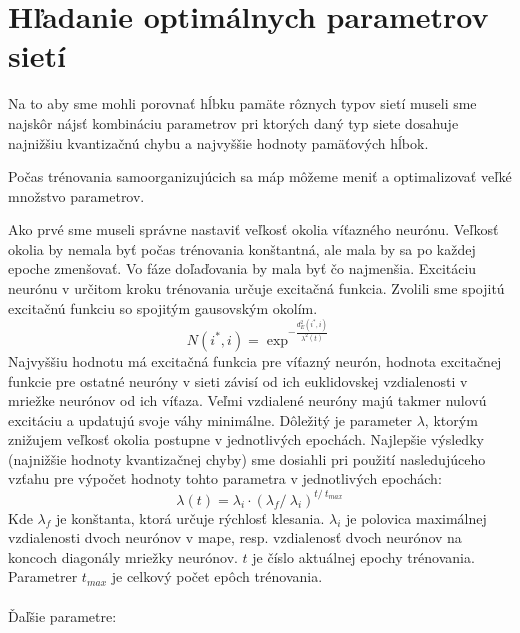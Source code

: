 \section{Hľadanie optimálnych parametrov sietí}
Na to aby sme mohli porovnať hĺbku pamäte rôznych typov sietí museli sme najskôr
nájsť kombináciu parametrov pri ktorých daný typ siete dosahuje najnižšiu kvantizačnú chybu a 
najvyššie hodnoty pamäťových hĺbok. 

Počas trénovania samoorganizujúcich sa máp môžeme meniť a optimalizovať veľké množstvo parametrov. 

Ako prvé sme museli správne nastaviť veľkosť okolia víťazného neurónu.
Veľkosť okolia by nemala byť počas trénovania konštantná, ale mala by sa po každej epoche zmenšovať.
Vo fáze doľaďovania by mala byť čo najmenšia.
Excitáciu neurónu v určitom kroku trénovania určuje excitačná funkcia. Zvolili sme spojitú
excitačnú funkciu so spojitým gausovským okolím. 
\begin{equation}
    N(i^{*}, i) = \exp^{- \frac{d^{2}_{E}(i^{*}, i)}{\lambda^{2}(t)}}
\end{equation}
Najvyššiu hodnotu má excitačná funkcia pre víťazný neurón, hodnota excitačnej funkcie pre ostatné 
neuróny v sieti závisí od ich euklidovskej vzdialenosti v mriežke neurónov od ich víťaza. Veľmi vzdialené neuróny 
majú takmer nulovú excitáciu a updatujú svoje váhy minimálne.
Dôležitý je parameter $\lambda$, ktorým znižujem veľkosť okolia postupne v jednotlivých epochách.
Najlepšie výsledky (najnižšie hodnoty kvantizačnej chyby) sme dosiahli pri použití nasledujúceho vzťahu pre výpočet hodnoty tohto parametra
v jednotlivých epochách:
\begin{equation}
    \lambda{(t)} = \lambda_{i} \cdot (\lambda_{f} /\ \lambda_{i})^{t /\ t_{max}}
\end{equation}
Kde $\lambda_{f}$ je konštanta, ktorá určuje rýchlosť klesania. 
$\lambda_{i}$ je polovica maximálnej vzdialenosti dvoch neurónov v mape, resp. 
vzdialenosť dvoch neurónov na koncoch diagonály mriežky neurónov.
$t$ je číslo aktuálnej epochy trénovania. Parametrer $t_{max}$ je celkový počet 
epôch trénovania.
\\ \\
Ďaľšie parametre:

